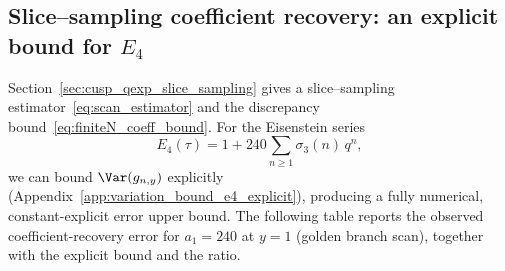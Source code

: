 \begin{table}[H]
\centering
{}
\caption{Roof-function mean fit: empirical averages of $r(G^j\xi)$ compared to $\pi^2/(6\log 2)$, aggregated over multiple independent orbits (distinct initial points). Reproducible via Experiment~VII in Appendix~\ref{app:repro_code}.}
\label{tab:roof_mean_fit}
\end{table}

\subsection{Slice--sampling coefficient recovery: an explicit bound for \texorpdfstring{$E_4$}{E4}}
\label{app:quant_fits_slice_sampling_e4}

Section~\ref{sec:cusp_qexp_slice_sampling} gives a slice--sampling estimator~\eqref{eq:scan_estimator} and the discrepancy bound~\eqref{eq:finiteN_coeff_bound}. For the Eisenstein series
\begin{equation}
E_4(\tau)=1+240\sum_{n\ge 1}\sigma_3(n)\,q^n,
\end{equation}
we can bound $\Var(g_{n,y})$ explicitly (Appendix~\ref{app:variation_bound_e4_explicit}), producing a fully numerical, constant-explicit error upper bound. The following table reports the observed coefficient-recovery error for $a_1=240$ at $y=1$ (golden branch scan), together with the explicit bound and the ratio.

